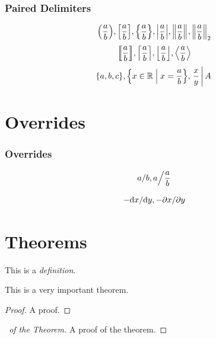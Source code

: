 \documentclass{beamer}
\begin{document}
\begin{frame}
    \frametitle{Paired Delimiters}
    \[
        \pqty{\frac{a}{b}}, \bqty{\frac{a}{b}}, \Bqty{\frac{a}{b}}, \abs{\frac{a}{b}}, \norm{\frac{a}{b}}, \norm[2]{\frac{a}{b}}
    \]
    \[
        \bbrac{\frac{a}{b}}, \ceil{\frac{a}{b}}, \floor{\frac{a}{b}}, \angBrac{\frac{a}{b}}
    \]
    \[
        \set{a, b, c}, \set{x \in \RR}{x = \frac{a}{b}}, \bound{\Conditional{\frac{x}{y}}{A}}
    \]
\end{frame}

\section{Overrides}

\begin{frame}
    \frametitle{Overrides}
    \[
        \flatfrac{a}{b}, \flatfrac{a}{\frac{a}{b}}
    \]

    \[
        -\dv*{x}{y}, -\pdv*{x}{y}
    \]
\end{frame}


\section{Theorems}

\begin{frame}
    \begin{definition}
        This is a \emph{definition}. \lipsum[1]
    \end{definition}
\end{frame}


\begin{frame}
    \begin{theorem}
        This is a very important theorem. \lipsum[2]
    \end{theorem}
\end{frame}

\begin{frame}
    \begin{proof}
        A proof. \lipsum[3]
    \end{proof}
\end{frame}

\begin{frame}
    \begin{proof}[\proofname\ of the Theorem]
        A proof of the theorem. \lipsum[4]
    \end{proof}
\end{frame}
\end{document}
